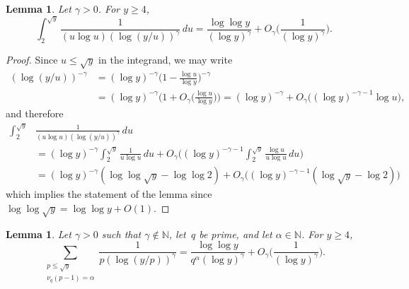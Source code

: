 \documentclass[12pt,reqno]{amsart}
\newtheorem{lemma}[theorem]{Lemma}
\theoremstyle{definition}
\newcommand{\N}{{\mathbb N}}
\begin{document}
\begin{lemma} \label{lint}
Let $\gamma>0$. For $y\ge 4$,
\[
\int_2^{\sqrt y} \frac 1{(u\log u)(\log(y/u))^\gamma} \,du = \frac{\log\log y}{(\log y)^\gamma}+O_\gamma\bigg( \frac 1{(\log y)^\gamma}\bigg).
\]
\end{lemma}

\begin{proof}
Since $u\le\sqrt y$ in the integrand, we may write
\begin{align*}
(\log(y/u))^{-\gamma} &= (\log y)^{-\gamma} \bigg( 1-\frac{\log u}{\log y} \bigg)^{-\gamma} \\
&= (\log y)^{-\gamma} \bigg( 1 + O_\gamma\bigg( \frac{\log u}{\log y} \bigg) \bigg) = (\log y)^{-\gamma} + O_\gamma \big( (\log y)^{-\gamma-1}\log u \big),
\end{align*}
and therefore
\begin{align*}
\int_2^{\sqrt y} & \frac 1{(u\log u)(\log(y/u))^\gamma} \,du \\
&= (\log y)^{-\gamma} \int_2^{\sqrt y} \frac 1{u\log u} \,du + O_\gamma\bigg( (\log y)^{-\gamma-1} \int_2^{\sqrt y} \frac{\log u}{u\log u} \,du \bigg) \\
&= (\log y)^{-\gamma} (\log\log \sqrt y-\log\log2) + O_\gamma\big( (\log y)^{-\gamma-1} (\log\sqrt y-\log 2) \big)
\end{align*}
which implies the statement of the lemma since $\log\log\sqrt y=\log\log y+O(1)$.
\end{proof}

\begin{lemma} \label{lsum}
Let $\gamma>0$ such that $\gamma\not\in\N$, let~$q$ be prime, and let $\alpha\in\N$. For $y\ge 4$,
\[
\sum_{\substack{p\le \sqrt y\\ \nu_q(p-1)=\alpha}} \frac1{p(\log(y/p))^\gamma} = \frac{\log\log y}{q^\alpha(\log y)^\gamma}+O_\gamma\bigg( \frac 1{(\log y)^\gamma}\bigg).
\]
\end{lemma}
\end{document}
